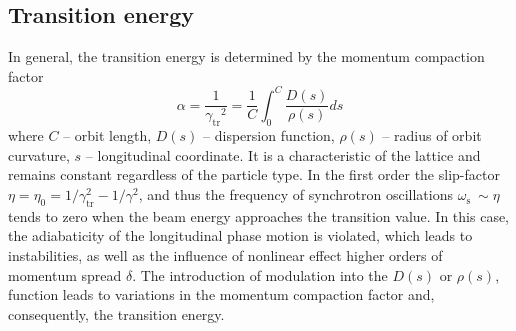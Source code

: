 \documentclass[submitting]{nst}
\begin{document}
	\subsection{Transition energy}
	\par In general, the transition energy is determined by the momentum compaction factor
	\begin{equation}
		\alpha=\frac{1}{{\gamma_{\text{tr}}}^2}=\frac{1}{C}\int_{0}^{C}{\frac{D\left(s\right)}{\rho\left(s\right)}ds}
	\end{equation}
	\noindent where $C$ -- orbit length, $D(s)$ -- dispersion function, $\rho(s)$ -- radius of orbit curvature, $s$ -- longitudinal coordinate. It is a characteristic of the lattice and remains constant regardless of the particle type. In the first order the slip-factor $\eta=\eta_0=1/\gamma_{\text{tr}}^2-1/\gamma^2$, and thus the frequency of synchrotron oscillations $\omega_{\text{s}}\ \sim \eta$ tends to zero when the beam energy approaches the transition value. In this case, the adiabaticity of the longitudinal phase motion is violated, which leads to instabilities, as well as the influence of nonlinear effect higher orders of momentum spread $\delta$. The introduction of modulation into the $D\left(s\right)$ or $\rho\left(s\right)$, function leads to variations in the momentum compaction factor and, consequently, the transition energy.
\end{document}
